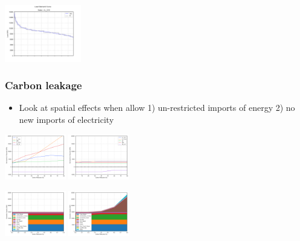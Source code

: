 \documentclass[xcolor=dvipsnames]{beamer}
\begin{document}
\begin{frame}
  \includegraphics[width=0.25\textwidth]{includes/LDC_node_IL_CHI.png}

\end{frame}


\begin{frame}
  \frametitle{Carbon leakage}

\begin{itemize}
  \item Look at spatial effects when allow 1) un-restricted imports of energy 2) no new imports of electricity
\end{itemize}




  \includegraphics[width=0.2\textwidth]{includes/leakage_net_imports.png}
  \includegraphics[width=0.2\textwidth]{includes/no_leakage_net_imports.png}

  \includegraphics[width=0.2\textwidth]{includes/leakage_WI_capacity.png}
  \includegraphics[width=0.2\textwidth]{includes/no_leakage_WI_capacity.png}


\end{frame}
\end{document}
